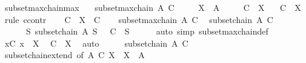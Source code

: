 \begin{isabellebody}
%
\endisatagproof
{\isafoldproof}%
%
\isadelimproof
%
\endisadelimproof
\isanewline
\isanewline
{}\isamarkupfalse%
\ subset{\isacharunderscore}{\kern0pt}maxchain{\isacharunderscore}{\kern0pt}max{\isacharcolon}{\kern0pt}\isanewline
\ \ \ {\isachardoublequoteopen}subset{\isachardot}{\kern0pt}maxchain\ A\ C{\isachardoublequoteclose}\isanewline
\ \ \ \ \ {\isachardoublequoteopen}X\ {\isasymin}\ A{\isachardoublequoteclose}\isanewline
\ \ \ \ \ {\isachardoublequoteopen}{\isasymUnion}C\ {\isasymsubseteq}\ X{\isachardoublequoteclose}\isanewline
\ \ \ {\isachardoublequoteopen}{\isasymUnion}C\ {\isacharequal}{\kern0pt}\ X{\isachardoublequoteclose}\isanewline
%
\isadelimproof
%
\endisadelimproof
%
\isatagproof
{}\isamarkupfalse%
\ {\isacharparenleft}{\kern0pt}rule\ ccontr{\isacharparenright}{\kern0pt}\isanewline
\ \ \isamarkupfalse%
\ {\isacharquery}{\kern0pt}C\ {\isacharequal}{\kern0pt}\ {\isachardoublequoteopen}{\isacharbraceleft}{\kern0pt}X{\isacharbraceright}{\kern0pt}\ {\isasymunion}\ C{\isachardoublequoteclose}\isanewline
\ \ \isamarkupfalse%
\ {\isacartoucheopen}subset{\isachardot}{\kern0pt}maxchain\ A\ C{\isacartoucheclose}\ \isamarkupfalse%
\ {\isachardoublequoteopen}subset{\isachardot}{\kern0pt}chain\ A\ C{\isachardoublequoteclose}\isanewline
\ \ \ \ \ {\isacharasterisk}{\kern0pt}{\isacharcolon}{\kern0pt}\ {\isachardoublequoteopen}{\isasymAnd}S{\isachardot}{\kern0pt}\ subset{\isachardot}{\kern0pt}chain\ A\ S\ {\isasymLongrightarrow}\ {\isasymnot}\ C\ {\isasymsubset}\ S{\isachardoublequoteclose}\isanewline
\ \ \ \ \isamarkupfalse%
\ {\isacharparenleft}{\kern0pt}auto\ simp{\isacharcolon}{\kern0pt}\ subset{\isachardot}{\kern0pt}maxchain{\isacharunderscore}{\kern0pt}def{\isacharparenright}{\kern0pt}\isanewline
\ \ \isamarkupfalse%
\ \isamarkupfalse%
\ {\isachardoublequoteopen}{\isasymforall}x{\isasymin}C{\isachardot}{\kern0pt}\ x\ {\isasymsubseteq}\ X{\isachardoublequoteclose}\ \isamarkupfalse%
\ {\isacartoucheopen}{\isasymUnion}C\ {\isasymsubseteq}\ X{\isacartoucheclose}\ \isamarkupfalse%
\ auto\isanewline
\ \ \isamarkupfalse%
\ \isamarkupfalse%
\ {\isachardoublequoteopen}subset{\isachardot}{\kern0pt}chain\ A\ {\isacharquery}{\kern0pt}C{\isachardoublequoteclose}\isanewline
\ \ \ \ \isamarkupfalse%
\ subset{\isachardot}{\kern0pt}chain{\isacharunderscore}{\kern0pt}extend\ {\isacharbrackleft}{\kern0pt}of\ A\ C\ X{\isacharbrackright}{\kern0pt}\ \ {\isacartoucheopen}X\ {\isasymin}\ A{\isacartoucheclose}\ \isamarkupfalse%

\end{isabellebody}
